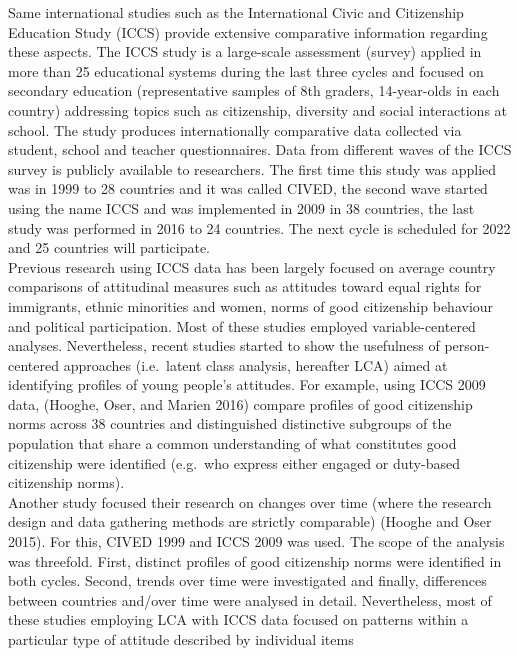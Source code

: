 \documentclass[
  11pt,
]{article}
\begin{document}
Same international studies such as the International Civic and
Citizenship Education Study (ICCS) provide extensive comparative
information regarding these aspects. The ICCS study is a large-scale
assessment (survey) applied in more than 25 educational systems during
the last three cycles and focused on secondary education (representative
samples of 8th graders, 14-year-olds in each country) addressing topics
such as citizenship, diversity and social interactions at school. The
study produces internationally comparative data collected via student,
school and teacher questionnaires. Data from different waves of the ICCS
survey is publicly available to researchers. The first time this study
was applied was in 1999 to 28 countries and it was called CIVED, the
second wave started using the name ICCS and was implemented in 2009 in
38 countries, the last study was performed in 2016 to 24 countries. The
next cycle is scheduled for 2022 and 25 countries will participate.\\
\newline  Previous research using ICCS data has been largely focused on
average country comparisons of attitudinal measures such as attitudes
toward equal rights for immigrants, ethnic minorities and women, norms
of good citizenship behaviour and political participation. Most of these
studies employed variable-centered analyses. Nevertheless, recent
studies started to show the usefulness of person-centered approaches
(i.e.~latent class analysis, hereafter LCA) aimed at identifying
profiles of young people's attitudes. For example, using ICCS 2009 data,
(Hooghe, Oser, and Marien 2016) compare profiles of good citizenship
norms across 38 countries and distinguished distinctive subgroups of the
population that share a common understanding of what constitutes good
citizenship were identified (e.g.~who express either engaged or
duty-based citizenship norms).\\
\newline  Another study focused their research on changes over time
(where the research design and data gathering methods are strictly
comparable) (Hooghe and Oser 2015). For this, CIVED 1999 and ICCS 2009
was used. The scope of the analysis was threefold. First, distinct
profiles of good citizenship norms were identified in both cycles.
Second, trends over time were investigated and finally, differences
between countries and/over time were analysed in detail. Nevertheless,
most of these studies employing LCA with ICCS data focused on patterns
within a particular type of attitude described by individual items
\end{document}
